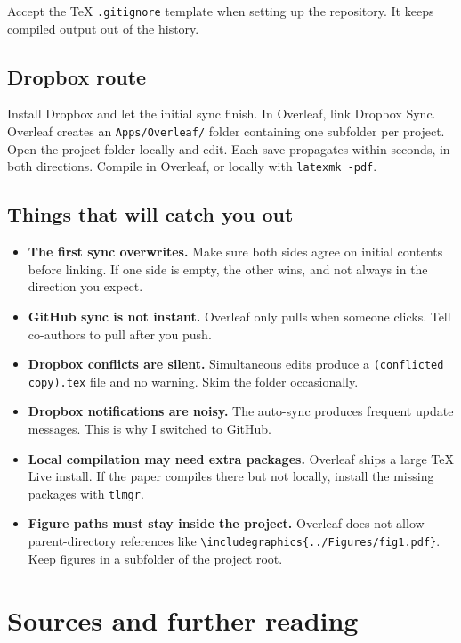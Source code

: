 \documentclass[11pt,a4paper]{article}
\newcommand{\code}[1]{\texttt{\small #1}}
\begin{document}
Accept the TeX \code{.gitignore} template when setting up the repository. It keeps
compiled output out of the history.

\subsection{Dropbox route}

Install Dropbox and let the initial sync finish. In Overleaf, link Dropbox Sync.
Overleaf creates an \code{Apps/Overleaf/} folder containing one subfolder per
project. Open the project folder locally and edit. Each save propagates within
seconds, in both directions. Compile in Overleaf, or locally with
\code{latexmk -pdf}.

\subsection{Things that will catch you out}

\begin{itemize}
\item \textbf{The first sync overwrites.} Make sure both sides agree on initial
  contents before linking. If one side is empty, the other wins, and not always in
  the direction you expect.
\item \textbf{GitHub sync is not instant.} Overleaf only pulls when someone
  clicks. Tell co-authors to pull after you push.
\item \textbf{Dropbox conflicts are silent.} Simultaneous edits produce a
  \code{(conflicted copy).tex} file and no warning. Skim the folder
  occasionally.
\item \textbf{Dropbox notifications are noisy.} The auto-sync produces frequent
  update messages. This is why I switched to GitHub.
\item \textbf{Local compilation may need extra packages.} Overleaf ships a large
  TeX Live install. If the paper compiles there but not locally, install the
  missing packages with \code{tlmgr}.
\item \textbf{Figure paths must stay inside the project.} Overleaf does not allow
  parent-directory references like
  \code{\textbackslash includegraphics\{../Figures/fig1.pdf\}}. Keep figures in a
  subfolder of the project root.
\end{itemize}

\clearpage
\section{Sources and further reading}
\end{document}
